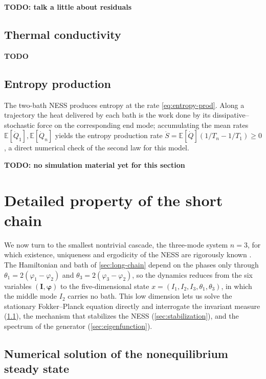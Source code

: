 \documentclass[11pt,a4paper]{article}
\theoremstyle{definition}
\newcommand{\E}{\mathbb{E}}
\numberwithin{equation}{section}   %
\newcommand{\bI}{\mathbf{I}}
\newcommand{\bphi}{\boldsymbol{\varphi}}
\begin{document}
\textbf{TODO: talk a little about residuals }



\subsection{Thermal conductivity}\label{sec:thermal-conductivity}

\textbf{TODO}

\subsection{Entropy production}\label{sec:entropy}

The two-bath NESS produces entropy at the rate \eqref{eq:entropy-prod}. Along a
trajectory the heat delivered by each bath is the work done by its
dissipative--stochastic force on the corresponding end mode; accumulating the
mean rates $\E[\dot Q_1],\E[\dot Q_n]$ yields the entropy production rate
$\dot S=\E[\dot Q](1/T_n-1/T_1)\ge0$, a direct numerical check of the second law
for this model. 

\textbf{TODO: no simulation material yet for this section }


\section{Detailed property of the short chain}\label{sec:short-chain}

We now turn to the smallest nontrivial cascade, the three-mode system $n=3$,
for which existence, uniqueness and ergodicity of the NESS are rigorously known
\cite{HLNS}. The Hamiltonian and bath of \cref{sec:long-chain} depend on the
phases only through $\theta_1=2(\varphi_1-\varphi_2)$ and
$\theta_3=2(\varphi_3-\varphi_2)$, so the dynamics reduces from the six
variables $(\bI,\bphi)$ to the five-dimensional state
$x=(I_1,I_2,I_3,\theta_1,\theta_3)$, in which the middle mode $I_2$ carries no
bath. This low dimension lets us solve the stationary Fokker--Planck equation
directly and interrogate the invariant measure (\cref{sec:fp-numerics}), the
mechanism that stabilizes the NESS (\cref{sec:stabilization}), and the spectrum
of the generator (\cref{sec:eigenfunction}).

\subsection{Numerical solution of the nonequilibrium steady state}\label{sec:fp-numerics}
\end{document}
